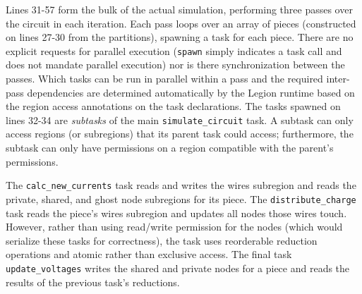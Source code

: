 Lines 31-57 form the bulk of the actual simulation, performing three
passes over the circuit in each iteration.  Each pass loops over an
array of pieces (constructed on lines 27-30 from the partitions),
spawning a task for each piece.  There are no explicit requests for
parallel execution ({\tt spawn} simply indicates a task call and does
not mandate parallel execution) nor is there synchronization 
between the passes.  Which tasks can be run in
parallel within a pass and the required inter-pass dependencies are
determined automatically by the Legion runtime based on the region
access annotations on the task declarations.  The tasks spawned on
lines 32-34 are {\em subtasks} of the main {\tt simulate\_circuit}
task. A subtask can only access regions (or subregions) that its parent task
could access; furthermore, the subtask can only have permissions on a
region compatible with the parent's permissions.  

The  {\tt calc\_new\_currents} task reads and writes the wires subregion 
and reads the private, shared, and ghost node subregions for its piece.
The {\tt distribute\_charge} task reads the piece's 
wires subregion and updates all nodes those wires touch.  However,
rather than using read/write permission for the nodes (which would
serialize these tasks for correctness), the task
uses reorderable reduction operations and 
atomic rather than exclusive access. The final task 
{\tt update\_voltages} writes the shared and private nodes for a piece
and reads the results of the previous task's reductions.

  



